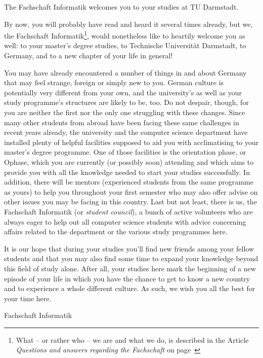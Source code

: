 {The Fachschaft Informatik welcomes you to your studies at TU Darmstadt.}{
By now, you will probably have read and heard it several times already, but we, the Fachschaft Informatik\footnote{What -- or rather who -- we are and what we do, is described in the Article \textit{Questions and answers regarding the Fachschaft} on page~\pageref{FSarticle}}, would nonetheless like to heartily welcome you as well: to your master's degree studies, to Technische Universität Darmstadt, to Germany, and to a new chapter of your life in general!

You may have already encountered a number of things in and about Germany that may feel strange, foreign or simply new to you.
German culture is potentially very different from your own, and the university's as well as your study programme's structures are likely to be, too.
Do not despair, though, for you are neither the first nor the only one struggling with these changes.
Since many other students from abroad have been facing these same challenges in recent years already, the university and the computer science department have installed plenty of helpful facilities supposed to aid you with acclimatising to your master's degree programme.
One of those facilities is the orientation phase, or Ophase, which you are currently (or possibly soon) attending and which aims to provide you with all the knowledge needed to start your studies successfully.
In addition, there will be mentors (experienced students from the same programme as yours) to help you throughout your first semester who may also offer advise on other issues you may be facing in this country.
Last but not least, there is us, the Fachschaft Informatik (or \textit{student council}), a bunch of active volunteers who are always eager to help out all computer science students with advice concerning affairs related to the department or the various study programmes here.

It is our hope that during your studies you'll find new friends among your fellow students and that you may also find some time to expand your knowledge beyond this field of study alone.
After all, your studies here mark the beginning of a new episode of your life in which you have the chance to get to know a new country and to experience a whole different culture.
As such, we wish you all the best for your time here.
}
{Fachschaft Informatik}

\noindent
{}


